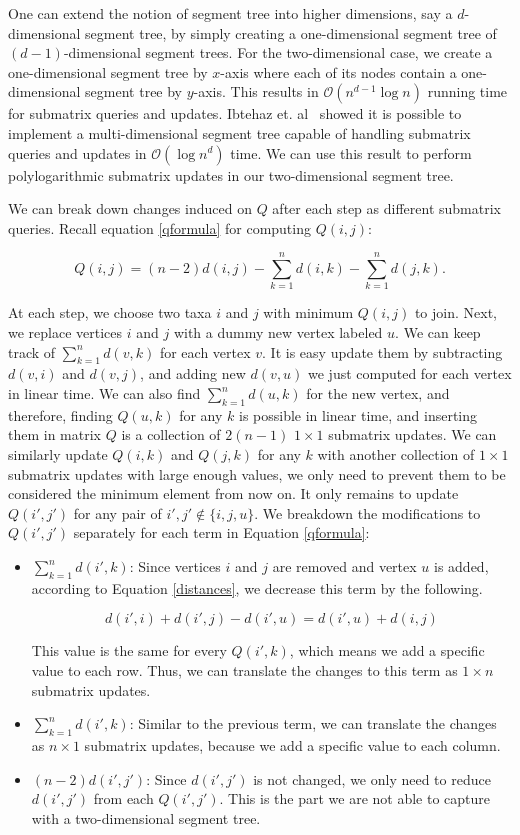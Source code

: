 One can extend the notion of segment tree into higher dimensions, say a $d$-dimensional segment tree, by simply creating a one-dimensional segment tree of $(d-1)$-dimensional segment trees.  For the two-dimensional case, we create a one-dimensional segment tree by $x$-axis where each of its nodes contain a one-dimensional segment tree by $y$-axis. This results in $\mathcal{O}(n^{d-1}\log{n})$ running time for submatrix queries and updates. Ibtehaz et. al~\cite{ibtehaz2018multidimensional} showed it is possible to implement a multi-dimensional segment tree capable of handling submatrix queries and updates in $\mathcal{O}(\log{n}^d)$ time. We can use this result to perform polylogarithmic submatrix updates in our two-dimensional segment tree.

We can break down changes induced on $Q$ after each step as different submatrix queries. Recall equation \ref{qformula} for computing $Q(i,j)$:


\[Q(i,j) = (n-2)d(i,j) -\sum_{k=1}^n d(i,k) - \sum_{k=1}^n d(j,k).\]


At each step, we choose two taxa $i$ and $j$ with minimum $Q(i, j)$ to join. Next, we replace vertices $i$ and $j$ with a dummy new vertex labeled $u$. We can keep track of $\sum_{k=1}^n{d(v, k)}$ for each vertex $v$. It is easy update them by subtracting $d(v, i)$ and $d(v, j)$, and adding new $d(v, u)$ we just computed for each vertex in linear time. We can also find $\sum_{k=1}^n{d(u, k)}$ for the new vertex, and therefore, finding $Q(u,k)$ for any $k$ is possible in linear time, and inserting them in matrix $Q$ is a collection of $2(n-1)$ $1\times 1$ submatrix updates. We can similarly update $Q(i, k)$ and $Q(j, k)$ for any $k$ with another collection of $1 \times 1$ submatrix updates with large enough values, we only need to prevent them to be considered the minimum element from now on. It only remains to update $Q(i', j')$ for any pair of $i', j' \not\in \{ i, j, u \}$. We breakdown the modifications to $Q(i', j')$ separately for each term in Equation \ref{qformula}:

\begin{itemize}
	\item $\sum_{k=1}^n{d(i', k)}$: Since vertices $i$ and $j$ are removed and vertex $u$ is added, according to Equation \ref{distances}, we decrease this term by the following.
	
	\[d(i', i) + d(i', j) - d(i', u) = d(i', u) + d(i, j)\]
	
	This value is the same for every $Q(i', k)$, which means we add a specific value to each row. Thus, we can translate the changes to this term as $1 \times n$ submatrix updates.
	
	\item $\sum_{k=1}^n{d(i', k)}$: Similar to the previous term, we can translate the changes as $n \times 1$ submatrix updates, because we add a specific value to each column.
	
	\item $(n-2)d(i', j')$: Since $d(i', j')$ is not changed, we only need to reduce $d(i', j')$ from each $Q(i', j')$. This is the part we are not able to capture with a two-dimensional segment tree.
\end{itemize}
